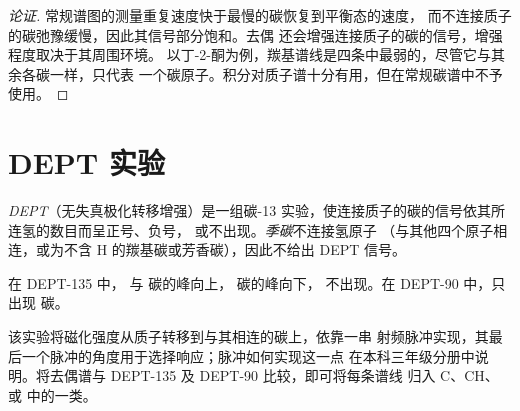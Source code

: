 \begin{proof}[论证]
常规谱图的测量重复速度快于最慢的碳恢复到平衡态的速度，
而不连接质子的碳弛豫缓慢，因此其信号部分饱和。去偶
还会增强连接质子的碳的信号，增强程度取决于其周围环境。
以丁-2-酮为例，羰基谱线是四条中最弱的，尽管它与其余各碳一样，只代表
一个碳原子。积分对质子谱十分有用，但在常规碳谱中不予使用。
\end{proof}

\section{DEPT 实验}

\begin{definition}[DEPT 实验]\label{def:b2:structure-determination:dept}
\emph{DEPT}（无失真极化转移增强）是一组碳-13
实验，使连接质子的碳的信号依其所连氢的数目而呈正号、负号，
或不出现。\emph{季碳}不连接氢原子
（与其他四个原子相连，或为不含 H 的羰基碳或芳香碳），因此不给出 DEPT 信号。
\end{definition}

\begin{proposition}\label{prop:b2:structure-determination:dept}
在 DEPT-135 中， 与  碳的峰向上， 碳的峰向下，
不出现。在 DEPT-90 中，只出现  碳。
\end{proposition}

\admitted

该实验将磁化强度从质子转移到与其相连的碳上，依靠一串
射频脉冲实现，其最后一个脉冲的角度用于选择响应；脉冲如何实现这一点
在本科三年级分册中说明。将去偶谱与 DEPT-135 及 DEPT-90 比较，即可将每条谱线
归入 C、CH、 或  中的一类。

